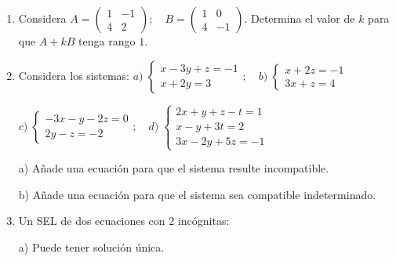\begin{enumerate}[Q1. ]

\item Considera $A=\left( \begin{matrix} 1&-1\\4&2 \end{matrix} \right); \quad B=\left( \begin{matrix} 1&0\\4&-1 \end{matrix} \right) $. Determina el valor de $k$ para que $A+kB$ tenga rango $1$.



\item Considera los sistemas: $a)\; \begin{cases} x-3y+z=-1\\x+2y=3  \end{cases}; \quad 
b)\; \begin{cases}  x+2z=-1\\3x+z=4 \end{cases}$ 

$c)\; \begin{cases} -3x-y-2z=0\\2y-z=-2  \end{cases}; \quad 
d)\; \begin{cases} 2x+y+z-t=1\\x-y+3t=2\\3x-2y+5z=-1  \end{cases}$

a) Añade una ecuación para que el sistema resulte incompatible.

b) Añade una ecuación para que el sistema sea compatible indeterminado.




\item Un SEL de dos ecuaciones  con 2 incógnitas:

a) Puede tener solución única.


\end{enumerate}
